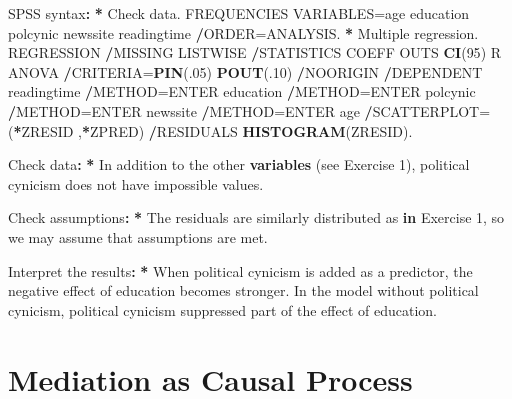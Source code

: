 \documentclass[a4paper]{book}
\newenvironment{Shaded}{\begin{snugshade}}{\end{snugshade}}
\newcommand{\KeywordTok}[1]{\textcolor[rgb]{0,0,0}{\textbf{#1}}}
\newcommand{\DecValTok}[1]{\textcolor[rgb]{0.00,0.00,0.00}{#1}}
\newcommand{\StringTok}[1]{\textcolor[rgb]{0.00,0.00,0.00}{#1}}
\newcommand{\ControlFlowTok}[1]{\textcolor[rgb]{0.00,0.00,0.00}{\textbf{#1}}}
\newcommand{\OperatorTok}[1]{\textcolor[rgb]{0.00,0.00,0.00}{\textbf{#1}}}
\newcommand{\ErrorTok}[1]{\textcolor[rgb]{0.00,0.00,0.00}{\textbf{#1}}}
\newcommand{\NormalTok}[1]{#1}
\theoremstyle{definition}
\theoremstyle{definition}
\theoremstyle{definition}
\theoremstyle{remark}
\begin{document}
\begin{Shaded}
\begin{Highlighting}[]
\NormalTok{SPSS syntax}\OperatorTok{:}\StringTok{  }
\StringTok{  }
\ErrorTok{*}\StringTok{ }\NormalTok{Check data.    }
\NormalTok{FREQUENCIES VARIABLES=age education polcynic newssite readingtime    }
  \OperatorTok{/}\NormalTok{ORDER=ANALYSIS.    }
\OperatorTok{*}\StringTok{ }\NormalTok{Multiple regression.    }
\NormalTok{REGRESSION    }
  \OperatorTok{/}\NormalTok{MISSING LISTWISE    }
  \OperatorTok{/}\NormalTok{STATISTICS COEFF OUTS }\KeywordTok{CI}\NormalTok{(}\DecValTok{95}\NormalTok{) R ANOVA    }
  \OperatorTok{/}\NormalTok{CRITERIA=}\KeywordTok{PIN}\NormalTok{(.}\DecValTok{05}\NormalTok{) }\KeywordTok{POUT}\NormalTok{(.}\DecValTok{10}\NormalTok{)    }
  \OperatorTok{/}\NormalTok{NOORIGIN     }
  \OperatorTok{/}\NormalTok{DEPENDENT readingtime    }
  \OperatorTok{/}\NormalTok{METHOD=ENTER education    }
  \OperatorTok{/}\NormalTok{METHOD=ENTER polcynic    }
  \OperatorTok{/}\NormalTok{METHOD=ENTER newssite    }
  \OperatorTok{/}\NormalTok{METHOD=ENTER age    }
  \OperatorTok{/}\NormalTok{SCATTERPLOT=(}\OperatorTok{*}\NormalTok{ZRESID ,}\OperatorTok{*}\NormalTok{ZPRED)    }
  \OperatorTok{/}\NormalTok{RESIDUALS }\KeywordTok{HISTOGRAM}\NormalTok{(ZRESID).    }
  
\NormalTok{Check data}\OperatorTok{:}\StringTok{  }
\StringTok{  }
\ErrorTok{*}\StringTok{ }\NormalTok{In addition to the other }\KeywordTok{variables}\NormalTok{ (see Exercise }\DecValTok{1}\NormalTok{), political cynicism does}
\NormalTok{not have impossible values.}
  
\NormalTok{Check assumptions}\OperatorTok{:}\StringTok{  }
\StringTok{  }
\ErrorTok{*}\StringTok{ }\NormalTok{The residuals are similarly distributed as }\ControlFlowTok{in}\NormalTok{ Exercise }\DecValTok{1}\NormalTok{, so we may assume}
\NormalTok{that assumptions are met.}
  
\NormalTok{Interpret the results}\OperatorTok{:}\StringTok{  }
\StringTok{  }
\ErrorTok{*}\StringTok{ }\NormalTok{When political cynicism is added as a predictor, the negative effect of}
\NormalTok{education becomes stronger. In the model without political cynicism,}
\NormalTok{political cynicism suppressed part of the effect of education.}
\end{Highlighting}
\end{Shaded}

\section{Mediation as Causal Process}\label{mediation-as-causal-process}
\end{document}
